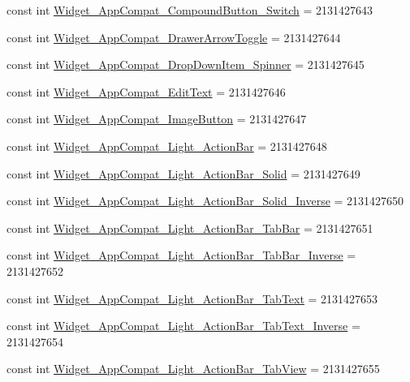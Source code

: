 \begin{CompactItemize}
\item 
const int \hyperlink{class__2doo_1_1_droid_1_1_resource_1_1_style_e15645b68859d6a103d9a7b469674af9}{Widget\_\-AppCompat\_\-CompoundButton\_\-Switch} = 2131427643
\item 
const int \hyperlink{class__2doo_1_1_droid_1_1_resource_1_1_style_5fc4dae99d0f5ce871f2bc7a11413d6a}{Widget\_\-AppCompat\_\-DrawerArrowToggle} = 2131427644
\item 
const int \hyperlink{class__2doo_1_1_droid_1_1_resource_1_1_style_069732ebc54e8ac4e522ede7db1e0849}{Widget\_\-AppCompat\_\-DropDownItem\_\-Spinner} = 2131427645
\item 
const int \hyperlink{class__2doo_1_1_droid_1_1_resource_1_1_style_575a8fda4639c09ae7eba0d8595ebf9b}{Widget\_\-AppCompat\_\-EditText} = 2131427646
\item 
const int \hyperlink{class__2doo_1_1_droid_1_1_resource_1_1_style_7fbe6ba57f9411ec6be4f1f80046d746}{Widget\_\-AppCompat\_\-ImageButton} = 2131427647
\item 
const int \hyperlink{class__2doo_1_1_droid_1_1_resource_1_1_style_8fb629e2744ee148758b071c6a9b5507}{Widget\_\-AppCompat\_\-Light\_\-ActionBar} = 2131427648
\item 
const int \hyperlink{class__2doo_1_1_droid_1_1_resource_1_1_style_347dcae2c132fdd06170673b16119463}{Widget\_\-AppCompat\_\-Light\_\-ActionBar\_\-Solid} = 2131427649
\item 
const int \hyperlink{class__2doo_1_1_droid_1_1_resource_1_1_style_59c7823c1db90c5d8abf08952e2953f4}{Widget\_\-AppCompat\_\-Light\_\-ActionBar\_\-Solid\_\-Inverse} = 2131427650
\item 
const int \hyperlink{class__2doo_1_1_droid_1_1_resource_1_1_style_ee82547a1d525ada7298d642ee3f1e0d}{Widget\_\-AppCompat\_\-Light\_\-ActionBar\_\-TabBar} = 2131427651
\item 
const int \hyperlink{class__2doo_1_1_droid_1_1_resource_1_1_style_3d5fbad40b6638d879fceef9ec245567}{Widget\_\-AppCompat\_\-Light\_\-ActionBar\_\-TabBar\_\-Inverse} = 2131427652
\item 
const int \hyperlink{class__2doo_1_1_droid_1_1_resource_1_1_style_7ce4870f30c95a6619db7029d6b064c9}{Widget\_\-AppCompat\_\-Light\_\-ActionBar\_\-TabText} = 2131427653
\item 
const int \hyperlink{class__2doo_1_1_droid_1_1_resource_1_1_style_ba49ea9688dadef3f7176aad4fb0f47b}{Widget\_\-AppCompat\_\-Light\_\-ActionBar\_\-TabText\_\-Inverse} = 2131427654
\item 
const int \hyperlink{class__2doo_1_1_droid_1_1_resource_1_1_style_165657555045d578ca7910adddbeb83a}{Widget\_\-AppCompat\_\-Light\_\-ActionBar\_\-TabView} = 2131427655

\end{CompactItemize}
